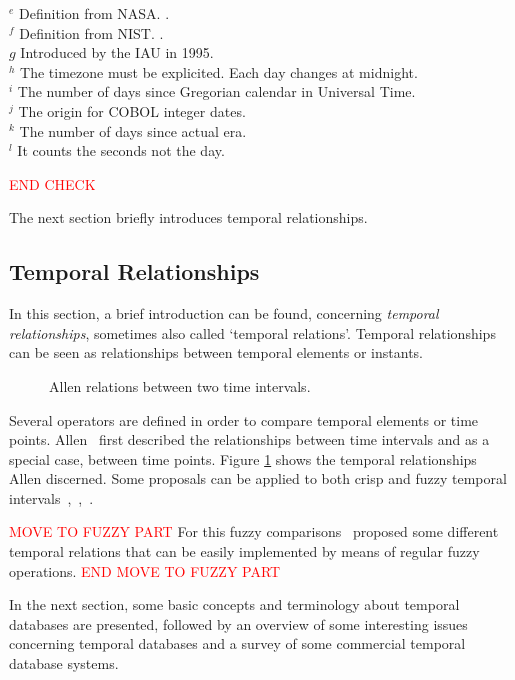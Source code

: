 \begin{table}
$^e$ Definition from NASA. \cite{Sch}. \\
$^f$ Definition from NIST. \cite{Nis}. \\
$g$ Introduced by the IAU in 1995. \\
$^h$ The timezone must be explicited. Each day changes at midnight. \\
$^i$ The number of days since Gregorian calendar in Universal Time. \\
$^j$ The origin for COBOL integer dates. \\
$^k$  The number of days since actual era. \\
$^l$  It counts the seconds not the day. \\
\end{table}

\textcolor{red}{END CHECK}

The next section briefly introduces temporal relationships.

\subsection{Temporal Relationships}
In this section, a brief introduction can be found, concerning \emph{temporal relationships}, sometimes also called `temporal relations'\cite{Billiet:Pons:Matthe:DeTre:Pons:2011:BipolarFuzzy}. Temporal relationships can be seen as relationships between temporal elements or instants.

\def\JPicScale{0.5}
\begin{figure}[h]
\centering

\caption{Allen relations between two time intervals.}
\label{fig:allen}
\end{figure}

Several operators are defined in order to compare temporal elements or time points. Allen~\cite{Allen83} first described the relationships between time intervals and as a special case, between time points. Figure \ref{fig:allen} shows the temporal relationships Allen discerned. Some proposals can be applied to both crisp and fuzzy temporal intervals~\cite{ohlbach2004},~\cite{nagypal2003},~\cite{schockaert08}. 

\textcolor{red}{MOVE TO FUZZY PART}
For this fuzzy comparisons~\cite{garrido2009} proposed some different temporal relations that can be easily implemented by means of regular fuzzy operations.
\textcolor{red}{END MOVE TO FUZZY PART}

In the next section, some basic concepts and terminology about temporal databases are presented, followed by an overview of some interesting issues concerning temporal databases and a survey of some commercial temporal database systems.